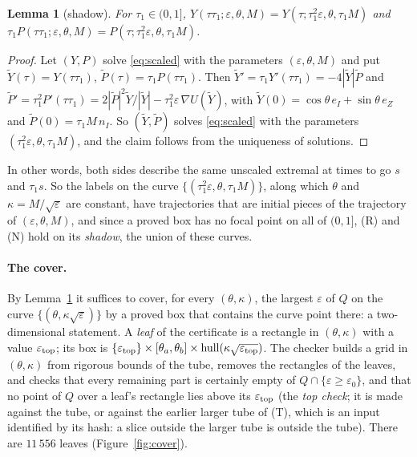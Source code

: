 \documentclass[11pt]{article}
\newtheorem{lemma}[theorem]{Lemma}
\theoremstyle{definition}
\begin{document}
\begin{lemma}[shadow]\label{lem:shadow}
For $\tau_1\in(0,1]$, $Y(\tau\tau_1;\varepsilon,\theta,M)=Y(\tau;\tau_1^2\varepsilon,\theta,\tau_1M)$ and
$\tau_1P(\tau\tau_1;\varepsilon,\theta,M)=P(\tau;\tau_1^2\varepsilon,\theta,\tau_1M)$.
\end{lemma}
\begin{proof}
Let $(Y,P)$ solve \eqref{eq:scaled} with the parameters $(\varepsilon,\theta,M)$ and put $\tilde Y(\tau)=Y(\tau\tau_1)$,
$\tilde P(\tau)=\tau_1P(\tau\tau_1)$. Then $\tilde Y'=\tau_1Y'(\tau\tau_1)=-4|\tilde Y|\tilde P$ and
$\tilde P'=\tau_1^2P'(\tau\tau_1)=2|\tilde P|^2\tilde Y/|\tilde Y|-\tau_1^2\varepsilon\,\nabla U(\tilde Y)$, with
$\tilde Y(0)=\cos\theta\,e_I+\sin\theta\,e_Z$ and $\tilde P(0)=\tau_1M\,n_I$. So $(\tilde Y,\tilde P)$ solves
\eqref{eq:scaled} with the parameters $(\tau_1^2\varepsilon,\theta,\tau_1M)$, and the claim follows from the uniqueness of
solutions.
\end{proof}
In other words, both sides describe the same unscaled extremal at times to go $s$ and $\tau_1s$. So the labels on the curve
$\{(\tau_1^2\varepsilon,\theta,\tau_1M)\}$, along which $\theta$ and $\kappa=M/\sqrt\varepsilon$ are constant, have
trajectories that are initial pieces of the trajectory of $(\varepsilon,\theta,M)$, and since a proved box has no
focal point on all of $(0,1]$, (R) and (N) hold on its \emph{shadow}, the union of these curves.

\paragraph{The cover.} By Lemma~\ref{lem:shadow} it suffices to cover, for every $(\theta,\kappa)$, the largest
$\varepsilon$ of $Q$ on the curve $\{(\theta,\kappa\sqrt\varepsilon)\}$ by a proved box that contains the curve point
there: a two-dimensional statement. A \emph{leaf} of the certificate is a rectangle in $(\theta,\kappa)$ with a value
$\varepsilon_{\rm top}$; its box is $\{\varepsilon_{\rm top}\}\times[\theta_a,\theta_b]\times
\mathrm{hull}(\kappa\sqrt{\varepsilon_{\rm top}})$. The checker builds a grid in $(\theta,\kappa)$ from rigorous bounds of
the tube, removes the rectangles of the leaves, and checks that every remaining part is certainly empty of
$Q\cap\{\varepsilon\ge\varepsilon_0\}$, and that no point of $Q$ over a leaf's rectangle lies above its
$\varepsilon_{\rm top}$ (the \emph{top check}; it is made against the tube, or against the earlier larger tube of (T),
which is an input identified by its hash: a slice outside the larger tube is outside the tube). There are $11\,556$ leaves
(Figure~\ref{fig:cover}).
\end{document}

